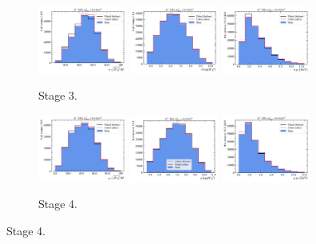 \begin{figure}[htb]
    \begin{subfigure}{\textwidth}
        \centering
        \includegraphics[width=0.32\textwidth]{./figs-mc-correction/reweighting-final/plot_step3-Dst_iso-pi_comp.pdf}
        \includegraphics[width=0.32\textwidth]{./figs-mc-correction/reweighting-final/plot_step3-Dst_iso-pi_log_ip_chi2.pdf}
        \includegraphics[width=0.32\textwidth]{./figs-mc-correction/reweighting-final/plot_step3-Dst_iso-pi_pt.pdf}
        \caption{Stage 3.}
    \end{subfigure}

    \begin{subfigure}{\textwidth}
        \centering
        \includegraphics[width=0.32\textwidth]{./figs-mc-correction/reweighting-final/plot_step4-Dst_iso-mu_comp.pdf}
        \includegraphics[width=0.32\textwidth]{./figs-mc-correction/reweighting-final/plot_step4-Dst_iso-mu_log_ip_chi2.pdf}
        \includegraphics[width=0.32\textwidth]{./figs-mc-correction/reweighting-final/plot_step4-Dst_iso-mu_pt.pdf}
        \caption{Stage 4.}
    \end{subfigure}


\end{figure}
